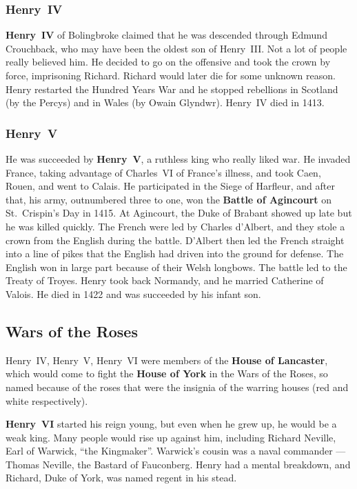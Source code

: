 \subsubsection*{Henry~IV}

\textbf{Henry~IV} of Bolingbroke claimed that he was descended through Edmund Crouchback,
who may have been the oldest son of Henry~III\@.
Not a lot of people really believed him.
He decided to go on the offensive and took the crown by force, imprisoning Richard.
Richard would later die for some unknown reason.
Henry restarted the Hundred Years War and he stopped rebellions
in Scotland (by the Percys) and in Wales (by Owain Glyndwr).
Henry~IV died in 1413.

\subsubsection*{Henry~V}

He was succeeded by \textbf{Henry~V}, a ruthless king who really liked war.
He invaded France, taking advantage of Charles~VI of France's illness,
and took Caen, Rouen, and went to Calais.
He participated in the Siege of Harfleur, and after that,
his army, outnumbered three to one, won the \textbf{Battle of Agincourt} on St.\ Crispin's Day in 1415.
At Agincourt, the Duke of Brabant showed up late but he was killed quickly.
The French were led by Charles d'Albert, and they stole a crown from the English during the battle.
D'Albert then led the French straight into a line of pikes that the English had driven into the ground for defense.
The English won in large part because of their Welsh longbows.
The battle led to the Treaty of Troyes.
Henry took back Normandy, and he married Catherine of Valois.
He died in 1422 and was succeeded by his infant son.

\subsection*{Wars of the Roses}

Henry~IV, Henry~V, Henry~VI were members of the \textbf{House of Lancaster},
which would come to fight the \textbf{House of York} in the Wars of the Roses,
so named because of the roses that were the insignia of the warring houses (red and white respectively).

\textbf{Henry~VI} started his reign young, but even when he grew up, he would be a weak king.
Many people would rise up against him, including Richard Neville, Earl of Warwick, ``the Kingmaker''.
Warwick's cousin was a naval commander --- Thomas Neville, the Bastard of Fauconberg.
Henry had a mental breakdown, and Richard, Duke of York, was named regent in his stead.

